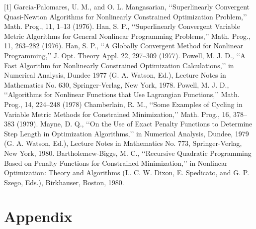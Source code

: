 \documentclass{article}
\begin{document}
[1] Garcia-Palomares, U. M., and O. L. Mangasarian, ‘‘Superlinearly Convergent
Quasi-Newton Algorithms for Nonlinearly Constrained Optimization Problem,’’
Math. Prog., 11, 1–13 (1976).
\newline\newline
[2] Han, S. P., ‘‘Superlinearly Convergent Variable Metric Algorithms for General Nonlinear Programming Problems,’’ Math. Prog., 11, 263–282 (1976).
\newline\newline
[3] Han, S. P., ‘‘A Globally Convergent Method for Nonlinear Programming,’’ J. Opt. Theory Appl. 22, 297–309 (1977).
\newline\newline
[4] Powell, M. J. D., ‘‘A Fast Algorithm for Nonlinearly Constrained Optimization Calculations,’’ in Numerical Analysis, Dundee 1977 (G. A. Watson, Ed.), Lecture Notes in Mathematics No. 630, Springer-Verlag, New York, 1978.
\newline\newline
[5] Powell, M. J. D., ‘‘Algorithms for Nonlinear Functions that Use Lagrangian Functions,’’ Math. Prog., 14, 224–248 (1978)
\newline\newline
[6] Chamberlain, R. M., ‘‘Some Examples of Cycling in Variable Metric Methods for Constrained Minimization,’’ Math. Prog., 16, 378–383 (1979).
\newline \newline
[7] Mayne, D. Q., ‘‘On the Use of Exact Penalty Functions to Determine Step Length in Optimization Algorithms,’’ in Numerical Analysis, Dundee, 1979 (G. A. Watson, Ed.), Lecture Notes in Mathematics No. 773, Springer-Verlag, New York, 1980.
\newline \newline
[8] Bartholemew-Biggs, M. C., ‘‘Recursive Quadratic Programming Based on Penalty Functions for Constrained Minimization,’’ in Nonlinear Optimization: Theory and Algorithms (L. C. W. Dixon, E. Spedicato, and G. P. Szego, Eds.), Birkhauser, Boston, 1980.

\section{Appendix}

\end{document}
